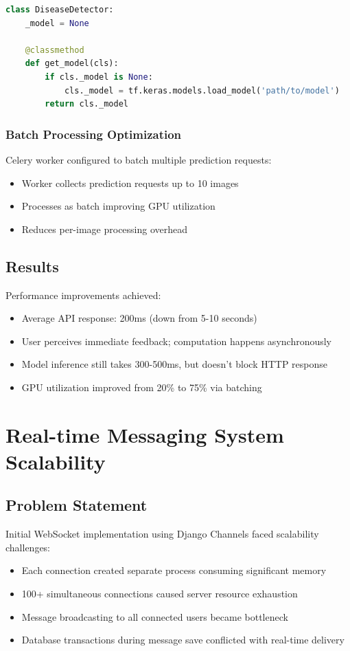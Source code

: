 \documentclass[12pt,a4paper]{report}
\begin{document}
\begin{lstlisting}[language=Python]
class DiseaseDetector:
    _model = None
    
    @classmethod
    def get_model(cls):
        if cls._model is None:
            cls._model = tf.keras.models.load_model('path/to/model')
        return cls._model
\end{lstlisting}

\subsubsection{Batch Processing Optimization}

Celery worker configured to batch multiple prediction requests:
\begin{itemize}
    \item Worker collects prediction requests up to 10 images
    \item Processes as batch improving GPU utilization
    \item Reduces per-image processing overhead
\end{itemize}

\subsection{Results}

Performance improvements achieved:
\begin{itemize}
    \item Average API response: 200ms (down from 5-10 seconds)
    \item User perceives immediate feedback; computation happens asynchronously
    \item Model inference still takes 300-500ms, but doesn't block HTTP response
    \item GPU utilization improved from 20\% to 75\% via batching
\end{itemize}

\section{Real-time Messaging System Scalability}

\subsection{Problem Statement}

Initial WebSocket implementation using Django Channels faced scalability challenges:
\begin{itemize}
    \item Each connection created separate process consuming significant memory
    \item 100+ simultaneous connections caused server resource exhaustion
    \item Message broadcasting to all connected users became bottleneck
    \item Database transactions during message save conflicted with real-time delivery
\end{itemize}
\end{document}
